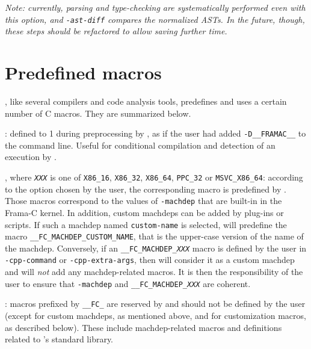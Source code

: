 {\em Note: currently, parsing and type-checking are systematically performed
  even with this option, and \verb|-ast-diff| compares the normalized ASTs.
  In the future, though, these steps should be refactored to allow saving
  further time.}

\section{Predefined macros}\label{sec:predefined-macros}

\FramaC, like several compilers and code analysis tools, predefines and uses
a certain number of C macros. They are summarized below.

\begin{description}
\item {}: defined to 1 during preprocessing by \FramaC,
as if the user had added \texttt{-D\_\_FRAMAC\_\_} to the command line. Useful
for conditional compilation and detection of an execution by \FramaC.

\item {}, where \texttt{{\em XXX}} is one of
  \texttt{X86\_16}, \texttt{X86\_32}, \texttt{X86\_64}, \texttt{PPC\_32} or
  \texttt{MSVC\_X86\_64}:
according to the option  chosen by the user,
the corresponding macro is predefined by \FramaC. Those macros correspond to
the values of \texttt{-machdep} that are built-in in the Frama-C kernel.
In addition, custom machdeps can be added
by plug-ins or scripts. If such a machdep named \texttt{custom-name}
is selected, \FramaC will predefine the macro
\texttt{\_\_FC\_MACHDEP\_CUSTOM\_NAME}, that is the upper-case version of the
name of the machdep.
Conversely, if an
\texttt{\_\_FC\_MACHDEP\_{\em XXX}} macro is defined by the user in
\texttt{-cpp-command} or \texttt{-cpp-extra-args}, then \FramaC
will consider it as a custom machdep and will {\em not} add any machdep-related
macros. It is then the responsibility of the user to ensure that
\texttt{-machdep} and \texttt{\_\_FC\_MACHDEP\_{\em XXX}} are coherent.

\item {}: macros prefixed by \texttt{\_\_FC\_} are reserved
  by \FramaC and should not be defined by the user (except for custom machdeps,
  as mentioned above, and for customization macros, as described below).
These include machdep-related macros and definitions
related to \FramaC's standard library.
\end{description}

